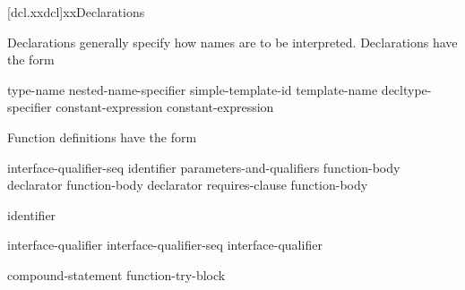 [dcl.xxdcl]{xxDeclarations}%



\pnum
Declarations generally specify how names are to be interpreted. Declarations have
the form

\begin{bnf}
\br
     type-name\br
    nested-name-specifier  simple-template-id\br
     template-name\br
    \br
    \br
    \br
    \br
    \br
    \br
    \br
    \br
    \br
    \br
    \br
    \br
    \br
    \br
    decltype-specifier\br
     \terminal{(} constant-expression \terminal{)} \atomicc \br
     \terminal{(} constant-expression \terminal{)} \atomicc
\end{bnf}

\pnum
{}%
Function definitions have the form

%
%
\begin{bnf}
\br
     interface-qualifier-seq identifier parameters-and-qualifiers function-body \atomicc\br
      declarator  function-body\br
      declarator requires-clause function-body
\end{bnf}

\begin{bnf}
 \atomicc\br
    identifier  \atomicc

 \atomicc\br
    interface-qualifier \atomicc\br
    interface-qualifier-seq interface-qualifier \atomicc
\end{bnf}

\begin{bnf}
\br
      compound-statement \atomicc\br
    function-try-block\br
    \br
\end{bnf}

